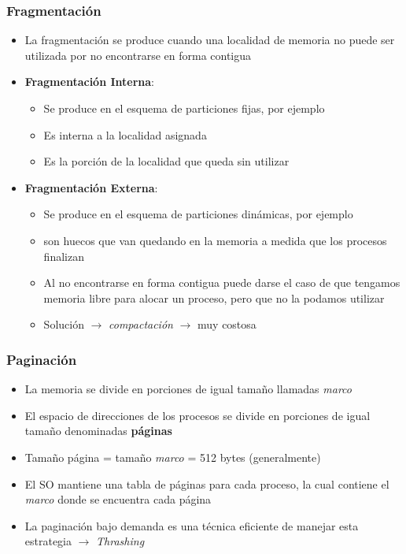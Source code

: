 \begin{frame}
  \frametitle{\textbf{Fragmentación}}
  \begin{itemize}
  	  \item La fragmentación se produce cuando una localidad de memoria no puede ser utilizada por no encontrarse en forma contigua
	  \item \textbf{Fragmentación Interna}:
	  \begin{itemize}
	  	\item Se produce en el esquema de particiones fijas, por ejemplo
	  	\item Es interna a la localidad asignada
	  	\item Es la porción de la localidad que queda sin utilizar
	  \end{itemize}
	  \item \textbf{Fragmentación Externa}:
	  \begin{itemize}
	  	\item Se produce en el esquema de particiones dinámicas, por ejemplo
	  	\item son huecos que van quedando en la memoria a medida que los procesos finalizan
	  	\item Al no encontrarse en forma contigua puede darse el caso de que tengamos memoria libre para alocar un proceso, pero que no la podamos utilizar
	  	\item Solución $\rightarrow$ \emph{compactación} $\rightarrow$ muy costosa
	  \end{itemize}
  \end{itemize}
\end{frame}

\begin{frame}
  \frametitle{\textbf{Paginación}}
  \begin{itemize}
  	  \item La memoria se divide en porciones de igual tamaño llamadas \emph{\emph{marco}}
	  \item El espacio de direcciones de los procesos se divide en porciones de igual tamaño denominadas \textbf{páginas}
	  \item Tamaño página = tamaño \emph{marco} = 512 bytes (generalmente)
	  \item El SO mantiene una tabla de páginas para cada proceso, la cual contiene el \emph{marco} donde se encuentra cada página
	  \item La paginación bajo demanda es una técnica eficiente de manejar esta estrategia $\rightarrow$ \emph{Thrashing}
  \end{itemize}
\end{frame}

